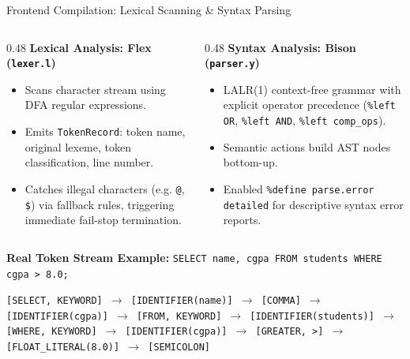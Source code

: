 \documentclass[aspectratio=169,10pt]{beamer}
\begin{document}
\begin{frame}{Frontend Compilation: Lexical Scanning \& Syntax Parsing}
    \begin{columns}[T]
        \begin{column}{0.48\textwidth}
            \textbf{Lexical Analysis: Flex (\texttt{lexer.l})}
            \begin{itemize}\footnotesize
                \item Scans character stream using DFA regular expressions.
                \item Emits \texttt{TokenRecord}: token name, original lexeme, token classification, line number.
                \item Catches illegal characters (e.g. \texttt{@}, \texttt{\$}) via fallback rules, triggering immediate fail-stop termination.
            \end{itemize}
        \end{column}
        \begin{column}{0.48\textwidth}
            \textbf{Syntax Analysis: Bison (\texttt{parser.y})}
            \begin{itemize}\footnotesize
                \item LALR(1) context-free grammar with explicit operator precedence (\texttt{\%left OR}, \texttt{\%left AND}, \texttt{\%left comp\_ops}).
                \item Semantic actions build AST nodes bottom-up.
                \item Enabled \texttt{\%define parse.error detailed} for descriptive syntax error reports.
            \end{itemize}
        \end{column}
    \end{columns}
    \vspace{0.8em}
    \textbf{Real Token Stream Example:} \texttt{SELECT name, cgpa FROM students WHERE cgpa > 8.0;}
    \begin{block}{}\footnotesize
        \texttt{[SELECT, KEYWORD] $\to$ [IDENTIFIER(name)] $\to$ [COMMA] $\to$ [IDENTIFIER(cgpa)] $\to$ [FROM, KEYWORD] $\to$ [IDENTIFIER(students)] $\to$ [WHERE, KEYWORD] $\to$ [IDENTIFIER(cgpa)] $\to$ [GREATER, >] $\to$ [FLOAT\_LITERAL(8.0)] $\to$ [SEMICOLON]}
    \end{block}
\end{frame}
\end{document}

